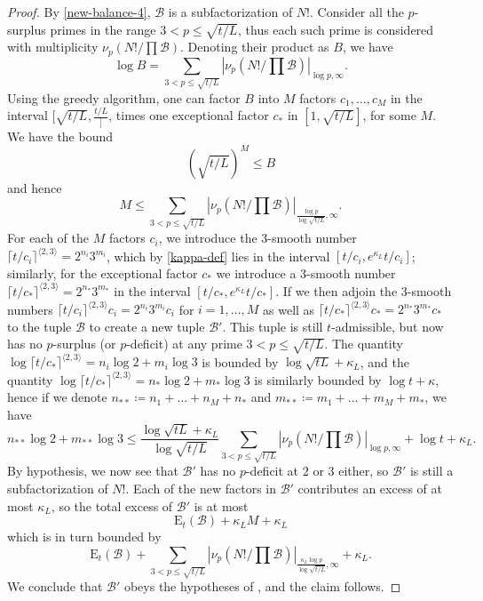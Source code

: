 \documentclass[12pt,a4paper,reqno]{amsart}
\numberwithin{equation}{section}
\theoremstyle{plain}
\theoremstyle{definition}
\newcommand\tuple{{\mathcal B}}
\newcommand\excess{{\mathrm{E}}}
\begin{document}
\begin{proof} By \eqref{new-balance-4}, $\tuple$ is a subfactorization of $N!$. Consider all the $p$-surplus primes in the range $3 < p \leq \sqrt{t/L}$, thus each such prime is considered with multiplicity $\nu_p(N!/\prod \tuple)$.  Denoting their product as $B$, we have
  $$ \log B = \sum_{3 < p \leq \sqrt{t/L}}
  |\nu_p(N!/\prod \tuple)|_{\log p,\infty}.$$
Using the greedy algorithm, one can factor $B$ into $M$ factors $c_1,\dots,c_M$ in the interval $[\sqrt{t/L}, \frac{t/L}]$, times one exceptional factor $c_*$ in $[1,\sqrt{t/L}]$, for some $M$.  We have the bound
$$ (\sqrt{t/L})^M \leq B$$
and hence
$$ M \leq \sum_{3 < p \leq \sqrt{t/L}}
|\nu_p(N!/\prod \tuple)|_{\frac{\log p}{\log\sqrt{t/L}},\infty}.$$
For each of the $M$ factors $c_i$, we introduce the $3$-smooth number $\lceil t/c_i\rceil^{\langle 2,3\rangle} = 2^{n_i} 3^{m_i}$, which by \eqref{kappa-def} lies in the interval $[t/c_i,e^{\kappa_L} t/c_i]$; similarly, for the exceptional factor $c_*$ we introduce a $3$-smooth number $\lceil t/c_* \rceil^{\langle 2,3 \rangle} = 2^{n_*} 3^{m_*}$ in the interval $[t/c_*,e^{\kappa_L} t/c_*]$.  If we then adjoin the $3$-smooth numbers $\lceil t/c_i\rceil^{\langle 2,3\rangle} c_i = 2^{n_i} 3^{m_i} c_i$ for $i=1,\dots,M$ as well as $\lceil t/c_*\rceil^{\langle 2,3\rangle} c_* = 2^{n_*} 3^{m_*} c_*$ to the tuple $\tuple$ to create a new tuple $\tuple'$.  This tuple is still $t$-admissible, but now has no $p$-surplus (or $p$-deficit) at any prime $3 < p \leq \sqrt{t/L}$.  The quantity $\log \lceil t/c_*\rceil^{\langle 2,3\rangle} = n_i \log 2 + m_i \log 3$ is bounded by $\log \sqrt{tL} + \kappa_L$, and the quantity $\log \lceil t/c_*\rceil^{\langle 2,3\rangle}  = n_* \log 2 + m_* \log 3$ is similarly bounded by $\log t + \kappa$, hence if we denote $n_{**} \coloneqq n_1 + \dots + n_M + n_*$ and $m_{**} \coloneqq m_1 + \dots + m_M + m_*$, we have
$$ n_{**} \log 2 + m_{**} \log 3 \leq 
\frac{\log \sqrt{tL} + \kappa_L}{\log\sqrt{t/L}}
\sum_{3 < p \leq \sqrt{t/L}}
|\nu_p(N!/\prod \tuple)|_{\log p,\infty}
+ \log t + \kappa_L.$$
By hypothesis, we now see that $\tuple'$ has no $p$-deficit at $2$ or $3$ either, so $\tuple'$ is still a subfactorization of $N!$.  Each of the new factors in $\tuple'$ contributes an excess of at most $\kappa_L$, so the total excess of $\tuple'$ is at most
$$ \excess_t(\tuple) + \kappa_L M + \kappa_L$$
which is in turn bounded by
$$ \excess_t(\tuple) + \sum_{3 < p \leq \sqrt{t/L}}
|\nu_p(N!/\prod \tuple)|_{\frac{\kappa_L \log p}{\log\sqrt{t/L}},\infty} + \kappa_L.$$
We conclude that $\tuple'$ obeys the hypotheses of , and the claim follows.
\end{proof}
\end{document}
